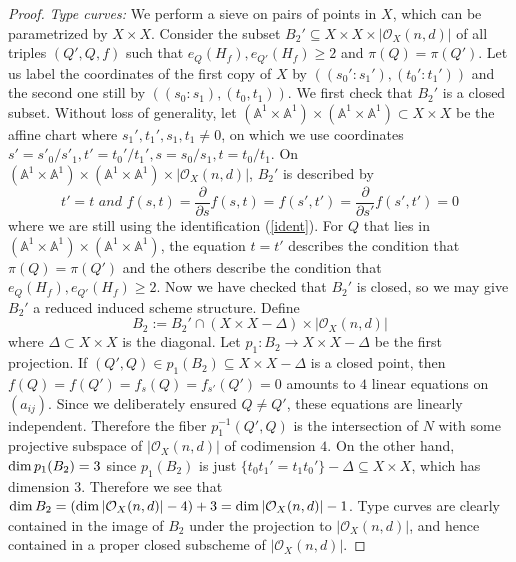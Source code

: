 \documentclass[12pt]{article}
\theoremstyle{plain}
\theoremstyle{definition}
\newcommand{\IA}{\mathbb{A}}
\newcommand{\sO}{\mathcal{O}}
\renewcommand\dim{{\rm dim\,}}
\newcommand{\<}{\langle}
\renewcommand{\>}{\rangle}
\newcommand{\p}{\partial}
\begin{document}
\begin{proof}
\textit{Type \uppercase\expandafter{} curves: }We perform a sieve on pairs of points in $X$, which can be parametrized by $X \times X$. Consider the subset $B_2' \subseteq X \times X \times |\sO_X(n, d)|$ of all triples $(Q', Q, f)$ such that $e_{Q}(H_f), e_{Q'}(H_f) \ge 2$ and $\pi(Q) = \pi(Q')$. Let us label the coordinates of the first copy of $X$ by $((s_0' : s_1'), (t_0' : t_1'))$ and the second one still by $((s_0 : s_1), (t_0, t_1))$. We first check that $B_2'$ is a closed subset. Without loss of generality, let $(\IA^1 \times \IA^1) \times (\IA^1 \times \IA^1) \subset X \times X$ be the affine chart where $s_1', t_1', s_1, t_1 \neq 0$, on which we use coordinates $s' = s'_0/s'_1, t' = t_0'/t_1', s = s_0/s_1, t = t_0/t_1$. On $(\IA^1 \times \IA^1) \times (\IA^1 \times \IA^1) \times |\sO_X(n, d)|$, $B_2'$ is described by 
\begin{equation} t' = t \textit{ and } f(s, t) = \frac{\p}{\p s}f(s, t) = f(s', t') = \frac{\p}{\p s'}f(s', t') = 0 \end{equation}
where we are still using the identification (\ref{ident}). For $Q$ that lies in $(\IA^1 \times \IA^1) \times (\IA^1 \times \IA^1)$, the equation $t = t'$ describes the condition that $\pi(Q)= \pi(Q')$ and the others describe the condition that $e_{Q}(H_f), e_{Q'}(H_f) \ge 2$.  Now we have checked that $B_2'$ is closed, so we may give $B_2'$ a reduced induced scheme structure. Define $$B_2 := B_2' \cap (X \times X - \Delta) \times |\sO_X(n, d)|$$ where $\Delta \subset X \times X$ is the diagonal. Let $p_1 : B_2 \to X \times X - \Delta$ be the first projection. If $(Q', Q) \in p_1(B_2) \subseteq X \times X - \Delta$ is a closed point, then $f(Q) = f(Q') = f_s(Q) = f_{s'}(Q') = 0$ amounts to $4$ linear equations on $(a_{ij})$. Since we deliberately ensured $Q \neq Q'$, these equations are linearly independent. Therefore the fiber $p_1^{-1}(Q', Q)$ is the intersection of $N$ with some projective subspace of $|\sO_X(n, d)|$ of codimension $4$. On the other hand, $\dim p_1(B_2) = 3$ since $p_1(B_2)$ is just $\{ t_0 t_1' = t_1 t_0' \} - \Delta \subseteq X \times X$, which has dimension $3$. Therefore we see that $\dim B_2 = (\dim |\sO_X(n, d)| - 4) + 3 = \dim |\sO_X(n, d)| -1$. Type \uppercase\expandafter{} curves are clearly contained in the image of $B_2$ under the projection to $|\sO_X(n, d)|$, and hence contained in a proper closed subscheme of $|\sO_X(n, d)|$.
\end{proof}
\end{document}
